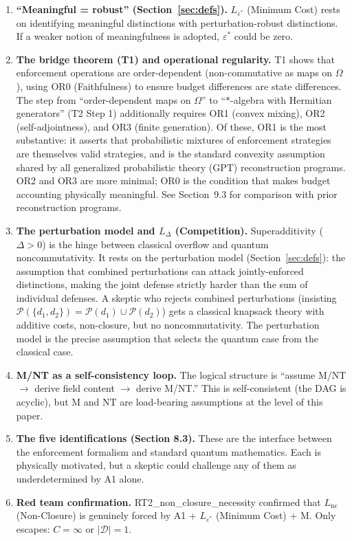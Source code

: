 \documentclass[11pt]{article}
\begin{document}
\begin{enumerate}
  \item \textbf{``Meaningful = robust'' (Section~\ref{sec:defs}).}  $L_{\varepsilon^*}$ (Minimum Cost) rests on identifying meaningful distinctions with perturbation-robust distinctions.  If a weaker notion of meaningfulness is adopted, $\varepsilon^*$ could be zero.

  \item \textbf{The bridge theorem (T1) and operational regularity.}  T1 shows that enforcement operations are order-dependent (non-commutative as maps on $\Omega$), using OR0 (Faithfulness) to ensure budget differences are state differences.  The step from ``order-dependent maps on $\Omega$'' to ``$*$-algebra with Hermitian generators'' (T2 Step 1) additionally requires OR1 (convex mixing), OR2 (self-adjointness), and OR3 (finite generation).  Of these, OR1 is the most substantive: it asserts that probabilistic mixtures of enforcement strategies are themselves valid strategies, and is the standard convexity assumption shared by all generalized probabilistic theory (GPT) reconstruction programs.  OR2 and OR3 are more minimal; OR0 is the condition that makes budget accounting physically meaningful.  See Section~9.3 for comparison with prior reconstruction programs.

  \item \textbf{The perturbation model and $L_\Delta$ (Competition).}  Superadditivity ($\Delta > 0$) is the hinge between classical overflow and quantum noncommutativity.  It rests on the perturbation model (Section~\ref{sec:defs}): the assumption that combined perturbations can attack jointly-enforced distinctions, making the joint defense strictly harder than the sum of individual defenses.  A skeptic who rejects combined perturbations (insisting $\mathcal{P}(\{d_1,d_2\}) = \mathcal{P}(d_1) \cup \mathcal{P}(d_2)$) gets a classical knapsack theory with additive costs, non-closure, but no noncommutativity.  The perturbation model is the precise assumption that selects the quantum case from the classical case.

  \item \textbf{M/NT as a self-consistency loop.}  The logical structure is ``assume M/NT $\to$ derive field content $\to$ derive M/NT.''  This is self-consistent (the DAG is acyclic), but M and NT are load-bearing assumptions at the level of this paper.

  \item \textbf{The five identifications (Section 8.3).}  These are the interface between the enforcement formalism and standard quantum mathematics.  Each is physically motivated, but a skeptic could challenge any of them as underdetermined by A1 alone.

  \item \textbf{Red team confirmation.}  RT2\_non\_closure\_necessity confirmed that $L_{\mathrm{nc}}$ (Non-Closure) is genuinely forced by A1 + $L_{\varepsilon^*}$ (Minimum Cost) + M.  Only escapes: $C = \infty$ or $|\mathcal{D}| = 1$.
\end{enumerate}
\end{document}
